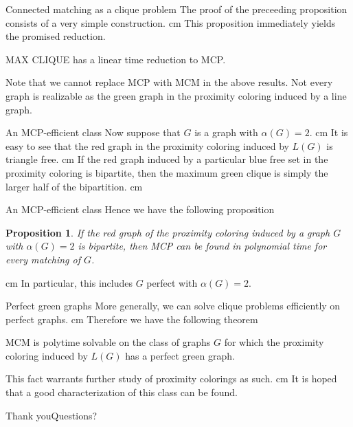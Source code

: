 \documentclass{beamer}
\newtheorem{prop}{Proposition}
\newcommand{\bframe}[2]{\begin{frame}{#1}#2\end{frame}}
\begin{document}
\bframe{Connected matching as a clique problem}{	
	The proof of the preceeding proposition consists of a very simple construction.\pause \vskip 0.5 cm
	This proposition immediately yields the promised reduction. \pause
	\begin{corollary}
		MAX CLIQUE has a linear time reduction to MCP.
	\end{corollary}  \pause
	Note that we cannot replace MCP with MCM in the above results.  Not every graph is realizable as the green graph in the proximity coloring induced by a line graph.}

\bframe{An MCP-efficient class}{
	Now suppose that $G$ is a graph with $\alpha(G) = 2$. \pause\vskip 0.5 cm
	It is easy to see that the red graph in the proximity coloring induced by $L(G)$ is triangle free.\pause\vskip 0.5 cm
	If the red graph induced by a particular blue free set in the proximity coloring is bipartite, then the maximum green clique is simply the larger half of the bipartition.\pause{} cm
	
	}

\bframe{An MCP-efficient class}{
	Hence we have the following proposition \pause
	\begin{prop}
		If the red graph of the proximity coloring induced by a graph $G$ with $\alpha(G) = 2$ is bipartite, then MCP can be found in polynomial time for every matching of $G$.
	\end{prop}\pause\vskip 0.5 cm
	In particular, this includes $G$ perfect with $\alpha(G)= 2$.\pause{}cm
	}

\bframe{Perfect green graphs}{
	More generally, we can solve clique problems efficiently on perfect graphs. \pause\vskip 0.5 cm
	Therefore we have the following theorem
	\begin{theorem}
		MCM is polytime solvable on the class of graphs $G$ for which the proximity coloring induced by $L(G)$ has a perfect green graph.
	\end{theorem}\pause
	This fact warrants further study of proximity colorings as such. \pause\vskip 0.5 cm
	It is hoped that a good characterization of this class can be found.}

\bframe{Thank you}{Questions?}
\end{document}
